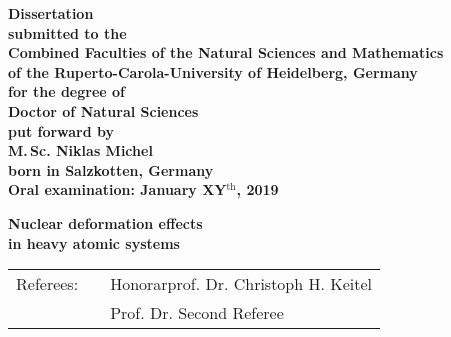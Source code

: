 
\begin{titlepage}
\begin{center}
  \renewcommand{\baselinestretch}{1.50}
  \normalsize\bfseries%
  Dissertation\\
  submitted to the\\
  Combined Faculties of the Natural Sciences and Mathematics\\
  of the Ruperto-Carola-University of Heidelberg, Germany\\
  for the degree of\\
  Doctor of Natural Sciences\\
  \vfill
  put forward by\\
  \vspace{0.5\baselineskip}
  {\Large M.$\,$Sc. Niklas Michel} \\
  \vspace{0.5\baselineskip}
  born in Salzkotten, Germany\\
  Oral examination: January XY$^{\textrm{th}}$, 2019
\end{center}
\end{titlepage}





\begin{titlepage}
\begin{center}
  \renewcommand{\baselinestretch}{1.50}
  \vspace*{1.5\baselineskip}
  \bfseries
  {\Huge Nuclear deformation effects}\\%
   \vspace{0.7\baselineskip} {\Huge in heavy atomic systems}
  \vfill
  \large%
  \begin{tabular}{lp{0.5cm}l}
  Referees: && Honorarprof. Dr. Christoph H. Keitel\\
  && Prof. Dr. Second Referee%
  \end{tabular}
\end{center}
\end{titlepage}

\renewcommand{\baselinestretch}{1.00}\normalsize


